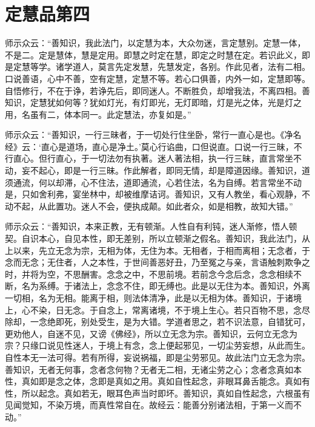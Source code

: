 \documentclass[12pt,twoside,openany]{book}
\begin{document}
\chapter{定慧品第四}
师示众云：“善知识，我此法门，以定慧为本，大众勿迷，言定慧别。定慧一体，不是二。定是慧体，慧是定用。即慧之时定在慧，即定之时慧在定。若识此义，即是定慧等学。诸学道人，莫言先定发慧，先慧发定，各别。作此见者，法有二相。口说善语，心中不善，空有定慧，定慧不等。若心口俱善，内外一如，定慧即等。自悟修行，不在于诤，若诤先后，即同迷人。不断胜负，却增我法，不离四相。善知识，定慧犹如何等？犹如灯光，有灯即光，无灯即暗，灯是光之体，光是灯之用，名虽有二，体本同一。此定慧法，亦复如是。”

师示众云：“善知识，一行三昧者，于一切处行住坐卧，常行一直心是也。《净名经》云：‘直心是道场，直心是净土。’莫心行谄曲，口但说直。口说一行三昧，不行直心。但行直心，于一切法勿有执著。迷人著法相，执一行三昧，直言常坐不动，妄不起心，即是一行三昧。作此解者，即同无情，却是障道因缘。善知识，道须通流，何以却滞，心不住法，道即通流，心若住法，名为自缚。若言常坐不动是，只如舍利弗，宴坐林中，却被维摩诘诃。善知识，又有人教坐，看心观静，不动不起，从此置功。迷人不会，便执成颠。如此者众，如是相教，故知大错。”

师示众云：“善知识，本来正教，无有顿渐。人性自有利钝，迷人渐修，悟人顿契。自识本心，自见本性，即无差别，所以立顿渐之假名。善知识，我此法门，从上以来，先立无念为宗，无相为体，无住为本。无相者，于相而离相；无念者，于念而无念；无住者，人之本性，于世间善恶好丑，乃至冤之与亲，言语触刺欺争之时，并将为空，不思酬害。念念之中，不思前境。若前念今念后念，念念相续不断，名为系缚。于诸法上，念念不住，即无缚也。此是以无住为本。善知识，外离一切相，名为无相。能离于相，则法体清净，此是以无相为体。善知识，于诸境上，心不染，日无念。于自念上，常离诸境，不于境上生心。若只百物不思，念尽除却，一念绝即死，别处受生，是为大错。学道者思之，若不识法意，自错犹可，更劝他人，自迷不见，又谤《佛经》，所以立无念为宗。善知识，云何立无念为宗？只缘口说见性迷人，于境上有念，念上便起邪见，一切尘劳妄想，从此而生。自性本无一法可得。若有所得，妄说祸福，即是尘劳邪见。故此法门立无念为宗。善知识，无者无何事，念者念何物？无者无二相，无诸尘劳之心；念者念真如本性，真如即是念之体，念即是真如之用。真如自性起念，非眼耳鼻舌能念。真如有性，所以起念。真如若无，眼耳色声当时即坏。善知识，真如自性起念，六根虽有见闻觉知，不染万境，而真性常自在。故经云：能善分别诸法相，于第一义而不动。”
\end{document}
